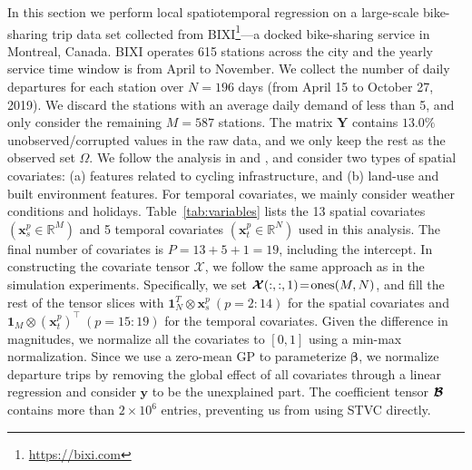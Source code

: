 \documentclass[12pt]{article}
\newcommand{\bd}[1]{\boldsymbol{#1}}
\begin{document}
In this section we perform local spatiotemporal regression on a large-scale bike-sharing trip data set collected from BIXI\footnote{\url{https://bixi.com}}---a docked bike-sharing service in Montreal, Canada. BIXI operates 615 stations across the city and the yearly service time window is from April to November. We collect the number of daily departures for each station over $N=196$ days (from April 15 to October 27, 2019). We discard the stations with an average daily demand of less than 5, and only consider the remaining $M=587$ stations. The matrix $\bd{Y}$ contains $13.0\%$ unobserved/corrupted values in the raw data, and we only keep the rest as the observed set $\Omega$. We follow the analysis in \citep{faghih2014land} and \citep{wang2021modeling}, and consider two types of spatial covariates: (a) features related to cycling infrastructure, and (b) land-use and built environment features. For temporal covariates, we mainly consider weather conditions and holidays. Table~\ref{tab:variables} lists the 13 spatial covariates $(\boldsymbol{x}_{s}^{p}\!\in\!\mathbb{R}^{M})$ and 5 temporal covariates $(\boldsymbol{x}_{t}^{p}\!\in\!\mathbb{R}^{N})$ used in this analysis. The final number of covariates is $P\!=\!13+5+1\!=\!19$, including the intercept. In constructing the covariate tensor $\boldsymbol{\mathcal{X}}$, we follow the same approach as in the simulation experiments. Specifically, we set $\bd{\cal{X}}(:,:,1)\!=\!\operatorname{ones}(M,N)$, and fill the rest of the tensor slices with  $\boldsymbol{1}_{N}^{T}\otimes\boldsymbol{x}_{s}^{p}~(p=2:14)$ for the spatial covariates and $\boldsymbol{1}_{M}\otimes(\boldsymbol{x}_{t}^{p})^{\top}~(p=15:19)$ for the temporal covariates. Given the difference in magnitudes, we normalize all the covariates to $[0,1]$ using a min-max normalization. Since we use a zero-mean GP to parameterize $\bd{\beta}$, we normalize departure trips by removing the global effect of all covariates through a linear regression and consider $\bd{y}$ to be the unexplained part. The coefficient tensor $\bd{\cal{B}}$ contains more than $2\times 10^6$ entries, preventing us from using STVC directly. 
\end{document}
